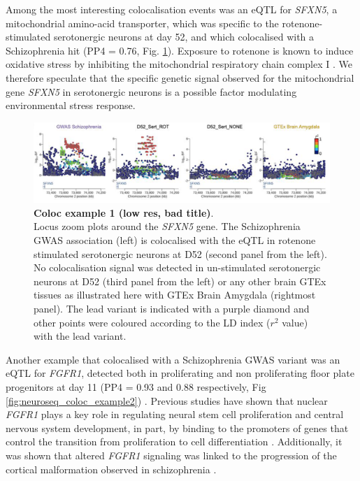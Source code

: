 \newpage

Among the most interesting colocalisation events was an eQTL for \textit{SFXN5}, a mitochondrial amino-acid transporter, which was specific to the rotenone-stimulated serotonergic neurons at day 52, and which colocalised with a Schizophrenia hit (PP4 = 0.76, Fig. \ref{fig:neuroseq_coloc_example1}). 
Exposure to rotenone is known to induce oxidative stress by inhibiting the mitochondrial respiratory chain complex I \cite{palmer1968studies, betarbet2000chronic}. 
We therefore speculate that the specific genetic signal observed for the mitochondrial gene \textit{SFXN5} in serotonergic neurons is a possible factor modulating environmental stress response.\\

\begin{figure}[h]
\centering
\includegraphics[width=16cm]{Chapter5/Fig/neuroseq_coloc_example1_SFXN5.png}
\caption[Coloc example 1]{\textbf{Coloc example 1 (low res, bad title)}.\\
Locus zoom plots around the \textit{SFXN5} gene. 
The Schizophrenia GWAS association (left) is colocalised with the eQTL in rotenone stimulated serotonergic neurons at D52 (second panel from the left). 
No colocalisation signal was detected in un-stimulated serotonergic neurons at D52 (third panel from the left) or any other brain GTEx tissues as illustrated here with GTEx Brain Amygdala (rightmost panel). 
The lead variant is indicated with a purple diamond and other points were coloured according to the LD index ($r^2$ value) with the lead variant.}
\label{fig:neuroseq_coloc_example1}
\end{figure}

Another example that colocalised with a Schizophrenia GWAS variant was an eQTL for
\textit{FGFR1}, detected both in proliferating and non proliferating floor plate progenitors at day 11 (PP4 = 0.93 and 0.88 respectively, Fig \ref{fig:neuroseq_coloc_example2}) . 
Previous studies have shown that nuclear \textit{FGFR1} plays a key role in regulating neural stem cell proliferation and central nervous system development, in part, by binding to the promoters of genes that control the transition from proliferation to cell differentiation \cite{ma2009molecular}. 
Additionally, it was shown that altered \textit{FGFR1} signaling was linked to the progression of the cortical malformation observed in schizophrenia \cite{stachowiak2017cerebral}.\\

